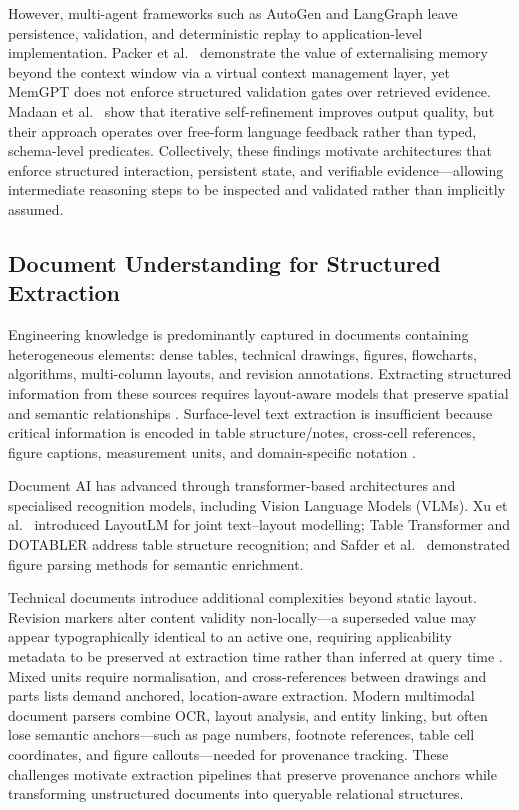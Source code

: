 \documentclass[largeformat]{interact}
\begin{document}
However, multi-agent frameworks such as AutoGen and LangGraph leave persistence, validation, and deterministic replay to application-level implementation. Packer et al.~\cite{packer2023memgpt} demonstrate the value of externalising memory beyond the context window via a virtual context management layer, yet MemGPT does not enforce structured validation gates over retrieved evidence. Madaan et al.~\cite{madaan2023selfrefine} show that iterative self-refinement improves output quality, but their approach operates over free-form language feedback rather than typed, schema-level predicates. Collectively, these findings motivate architectures that enforce structured interaction, persistent state, and verifiable evidence---allowing intermediate reasoning steps to be inspected and validated rather than implicitly assumed.

\subsection{Document Understanding for Structured Extraction}
\label{sec:document_understanding}
Engineering knowledge is predominantly captured in documents containing heterogeneous elements: dense tables, technical drawings, figures, flowcharts, algorithms, multi-column layouts, and revision annotations. Extracting structured information from these sources requires layout-aware models that preserve spatial and semantic relationships \cite{zhang2025doc}. Surface-level text extraction is insufficient because critical information is encoded in table structure/notes, cross-cell references, figure captions, measurement units, and domain-specific notation \cite{guo2026dtbench, foppiano2019}.

Document AI has advanced through transformer-based architectures and specialised recognition models, including Vision Language Models (VLMs). Xu et al.~\cite{xu2020} introduced LayoutLM for joint text--layout modelling; Table Transformer \cite{lin2022tsrformer, nassar2022tableformer} and  DOTABLER \cite{li2025surface} address table structure recognition; and Safder et al.~\cite{safder2022} demonstrated figure parsing methods for semantic enrichment.

Technical documents introduce additional complexities beyond static layout. Revision markers alter content validity non-locally---a superseded value may appear typographically identical to an active one, requiring applicability metadata to be preserved at extraction time rather than inferred at query time \cite{xie2026agentframework}. Mixed units require normalisation, and cross-references between drawings and parts lists demand anchored, location-aware extraction. Modern multimodal document parsers combine OCR, layout analysis, and entity linking, but often lose semantic anchors---such as page numbers, footnote references, table cell coordinates, and figure callouts---needed for provenance tracking. These challenges motivate extraction pipelines that preserve provenance anchors while transforming unstructured documents into queryable relational structures.
\end{document}
